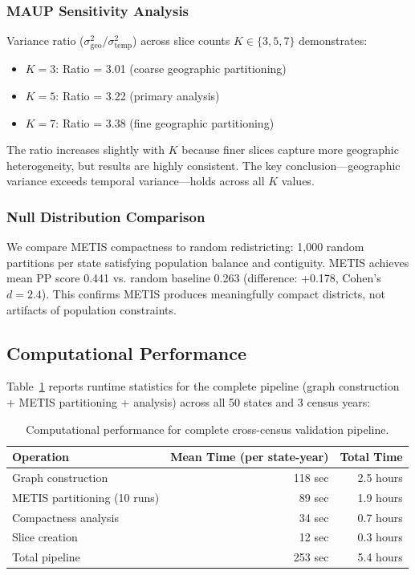 \subsubsection{MAUP Sensitivity Analysis}

Variance ratio ($\sigma^2_{\text{geo}} / \sigma^2_{\text{temp}}$) across slice counts $K \in \{3, 5, 7\}$ demonstrates:
\begin{itemize}
    \item $K=3$: Ratio = 3.01 (coarse geographic partitioning)
    \item $K=5$: Ratio = 3.22 (primary analysis)
    \item $K=7$: Ratio = 3.38 (fine geographic partitioning)
\end{itemize}

The ratio increases slightly with $K$ because finer slices capture more geographic heterogeneity, but results are highly consistent. The key conclusion—geographic variance exceeds temporal variance—holds across all $K$ values.

\subsubsection{Null Distribution Comparison}

We compare METIS compactness to random redistricting: 1,000 random partitions per state satisfying population balance and contiguity. METIS achieves mean PP score 0.441 vs. random baseline 0.263 (difference: +0.178, Cohen's $d=2.4$). This confirms METIS produces meaningfully compact districts, not artifacts of population constraints.

\subsection{Computational Performance}

Table~\ref{tab:runtime} reports runtime statistics for the complete pipeline (graph construction + METIS partitioning + analysis) across all 50 states and 3 census years:

\begin{table}[t]
\centering
\caption{Computational performance for complete cross-census validation pipeline.}
\label{tab:runtime}
\begin{tabular}{lrr}
\toprule
Operation & Mean Time (per state-year) & Total Time \\
\midrule
Graph construction & 118 sec & 2.5 hours \\
METIS partitioning (10 runs) & 89 sec & 1.9 hours \\
Compactness analysis & 34 sec & 0.7 hours \\
Slice creation & 12 sec & 0.3 hours \\
\midrule
Total pipeline & 253 sec & 5.4 hours \\
\bottomrule
\end{tabular}
\end{table}

